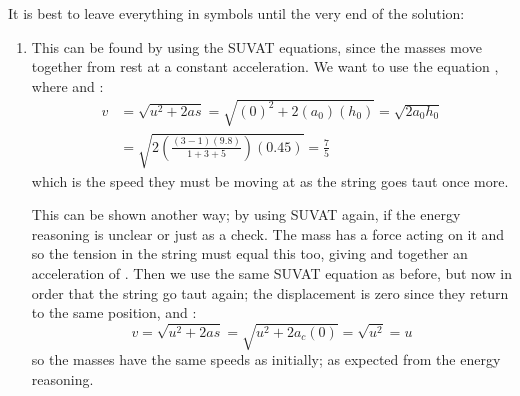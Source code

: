 \begin{problem}[A1969AMIIQ2a]
{It is best to leave everything in symbols until the very end of the solution:
	\begin{enumerate}
		\item {}

		This can be found by using the SUVAT equations, since the masses move together from rest at a constant acceleration. We want to use the equation , where   and :
		\begin{eqnarray*} 
			v &= \sqrt{u^{2} + 2as} = \sqrt{(0)^{2} + 2(a_{0})(h_{0})} = \sqrt{2a_{0}h_{0}} \\
 			&= \sqrt{2\left(\frac{(3 - 1)(9.8)}{1 + 3 + 5}\right)(0.45)} = \frac{7}{5}  
 		\end{eqnarray*}
		which is the speed they must be moving at as the string goes taut once more. 

		This can be shown another way; by using SUVAT again, if the energy reasoning is unclear or just as a check. The mass  has a force  acting on it and so the tension in the string must equal this too, giving  and  together an acceleration of . Then we use the same SUVAT equation as before, but now  in order that the string go taut again; the displacement is zero since they return to the same position, and :
		\begin{equation*} 
			v = \sqrt{u^{2} + 2as} = \sqrt{u^{2} + 2a_{c}(0)} = \sqrt{u^{2}} = u 
		\end{equation*}
		so the masses have the same speeds as initially; as expected from the energy reasoning.


\end{enumerate}}
\end{problem}
